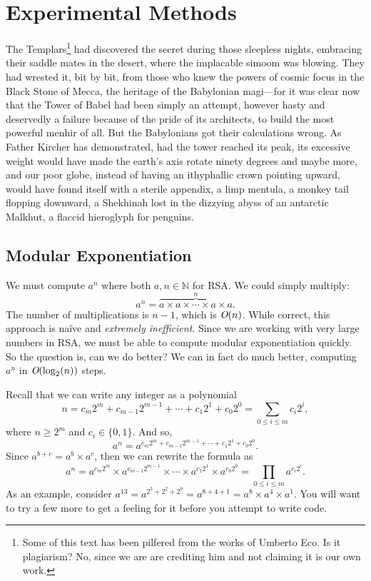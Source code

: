 \documentclass[11pt]{article}
\begin{document}
\section{Experimental Methods}\label{ss:method}
The Templars\footnote{Some of this text has been pilfered from the works of Umberto Eco. Is it plagiarism? No, since we are are crediting him and not claiming it is our own work.}
had discovered the secret during those sleepless nights,
embracing their saddle mates in the desert, where the implacable
simoom was blowing. They had wrested it, bit by bit, from those who
knew the powers of cosmic focus in the Black Stone of Mecca, the
heritage of the Babylonian magi---for it was clear now that the Tower
of Babel had been simply an attempt, however hasty and deservedly
a failure because of the pride of its architects, to build the most
powerful menhir of all. But the Babylonians got their calculations
wrong. As Father Kircher has demonstrated, had the tower reached
its peak, its excessive weight would have made the earth’s axis
rotate ninety degrees and maybe more, and our poor globe, instead
of having an ithyphallic crown pointing upward, would have found
itself with a sterile appendix, a limp mentula, a monkey tail
flopping downward, a Shekhinah lost in the dizzying abyss of an
antarctic Malkhut, a flaccid hieroglyph for penguins.

\subsection{Modular Exponentiation}

We must compute $a^n$ where both $a, n \in \mathbb{N}$
for RSA. We could simply multiply:
\[
  a^n = \overbrace{a \times a \times \cdots \times a \times a}^n .
\]
The number of multiplications is $n-1$,
which is $\emph{O}(n)$. While correct, this approach is na{\"{i}}ve and
\emph{extremely inefficient}. Since we are working with very large
numbers in RSA, we must be able to compute modular exponentiation
quickly. So the question is, can we do better? We can in fact do much
better, computing $a^n$ in $\emph{O}(\log_2(n))$ steps.

Recall that we can write any integer as a polynomial
\[
  n = c_m 2^m + c_{m-1} 2^{m-1} + \cdots + c_1 2^1 + c_0 2^0 =
  \sum_{0\le i \le m} c_i 2^i ,
\]
where $n \ge 2^m$ and $c_i \in \{0, 1\}$. And so,
\[
  a^n = a^{c_m 2^m + c_{m-1} 2^{m-1} + \cdots + c_1 2^1 + c_0 2^0} .
\]
Since $a^{b+c} = a^b \times a^c$, then we can rewrite the formula as
\[
  a^n = a^{c_m 2^m} \times a^{c_{m-1} 2^{m-1}} \times \cdots \times
  a^{c_1 2^1} \times a^{c_0 2^0} = \prod_{0\le i \le m} a^{c_i 2^i} .
\]
As an example, consider $a^{13} = a^{2^3 + 2^2 + 2^0} = a^{8 + 4 + 1} =
a^8 \times a^4 \times a^1$. You will want to try a few more to get a
feeling for it before you attempt to write code.
\end{document}
